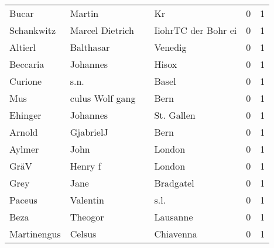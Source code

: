 \begin{center}
\begin{tiny}
\begin{longtabu}{llllrr}
                    Bucar &                             Martin &             &                                          Kr &          0 &         1 \\
               Schankwitz &                    Marcel Dietrich &             &                         IiohrTC der Bohr ei &          0 &         1 \\
                  Altierl &                          Balthasar &             &                                     Venedig &          0 &         1 \\
                 Beccaria &                           Johannes &             &                                       Hisox &          0 &         1 \\
                  Curione &                               s.n. &             &                                       Basel &          0 &         1 \\
                      Mus &                    culus Wolf gang &             &                                        Bern &          0 &         1 \\
                  Ehinger &                           Johannes &             &                                  St. Gallen &          0 &         1 \\
                   Arnold &                          GjabrielJ &             &                                        Bern &          0 &         1 \\
                   Aylmer &                               John &             &                                      London &          0 &         1 \\
                     GräV &                            Henry f &             &                                      London &          0 &         1 \\
                     Grey &                               Jane &             &                                   Bradgatel &          0 &         1 \\
                   Paceus &                           Valentin &             &                                        s.l. &          0 &         1 \\
                     Beza &                            Theogor &             &                                    Lausanne &          0 &         1 \\
              Martinengus &                             Celsus &             &                                   Chiavenna &          0 &         1 \\

\end{longtabu}
\end{tiny}
\end{center}
